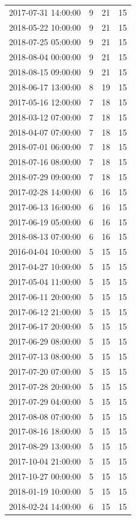 \begin{tabular}{lrrr}
2017-07-31 14:00:00 & 9 & 21 & 15 \\
2018-05-22 10:00:00 & 9 & 21 & 15 \\
2018-07-25 05:00:00 & 9 & 21 & 15 \\
2018-08-04 00:00:00 & 9 & 21 & 15 \\
2018-08-15 09:00:00 & 9 & 21 & 15 \\
2018-06-17 13:00:00 & 8 & 19 & 15 \\
2017-05-16 12:00:00 & 7 & 18 & 15 \\
2018-03-12 07:00:00 & 7 & 18 & 15 \\
2018-04-07 07:00:00 & 7 & 18 & 15 \\
2018-07-01 06:00:00 & 7 & 18 & 15 \\
2018-07-16 08:00:00 & 7 & 18 & 15 \\
2018-07-29 09:00:00 & 7 & 18 & 15 \\
2017-02-28 14:00:00 & 6 & 16 & 15 \\
2017-06-13 16:00:00 & 6 & 16 & 15 \\
2017-06-19 05:00:00 & 6 & 16 & 15 \\
2018-08-13 07:00:00 & 6 & 16 & 15 \\
2016-04-04 10:00:00 & 5 & 15 & 15 \\
2017-04-27 10:00:00 & 5 & 15 & 15 \\
2017-05-04 11:00:00 & 5 & 15 & 15 \\
2017-06-11 20:00:00 & 5 & 15 & 15 \\
2017-06-12 21:00:00 & 5 & 15 & 15 \\
2017-06-17 20:00:00 & 5 & 15 & 15 \\
2017-06-29 08:00:00 & 5 & 15 & 15 \\
2017-07-13 08:00:00 & 5 & 15 & 15 \\
2017-07-20 07:00:00 & 5 & 15 & 15 \\
2017-07-28 20:00:00 & 5 & 15 & 15 \\
2017-07-29 04:00:00 & 5 & 15 & 15 \\
2017-08-08 07:00:00 & 5 & 15 & 15 \\
2017-08-16 18:00:00 & 5 & 15 & 15 \\
2017-08-29 13:00:00 & 5 & 15 & 15 \\
2017-10-04 21:00:00 & 5 & 15 & 15 \\
2017-10-27 00:00:00 & 5 & 15 & 15 \\
2018-01-19 10:00:00 & 5 & 15 & 15 \\
2018-02-24 14:00:00 & 6 & 15 & 15 \\

\end{tabular}
